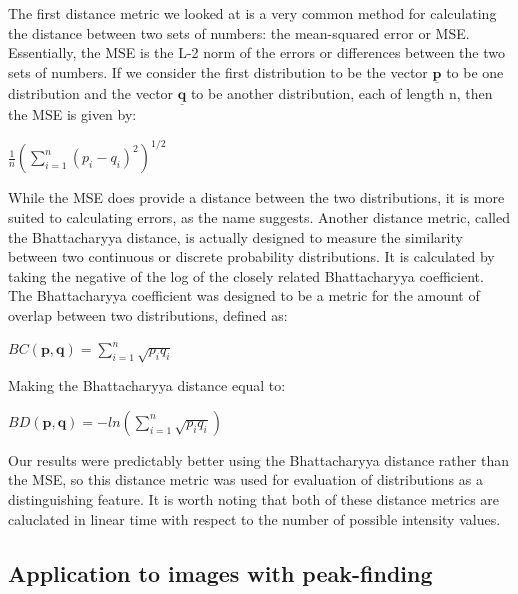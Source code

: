The first distance metric we looked at is a very common method for calculating the distance between two sets of numbers: the mean-squared error or MSE.
Essentially, the MSE is the L-2 norm of the errors or differences between the two sets of numbers.
If we consider the first distribution to be the vector $\underline{\mathbf{p}}$ to be one distribution and the vector $\underline{\mathbf{q}}$ to be another distribution, each of length n, then the MSE is given by:

\begin{center}
\begin{math}
\frac{1}{n} (\sum\limits_{i=1}^n{(p_i-q_i)^2})^{1/2}
\end{math}
\end{center}

While the MSE does provide a distance between the two distributions, it is more suited to calculating errors, as the name suggests.
Another distance metric, called the Bhattacharyya distance, is actually designed to measure the similarity between two continuous or discrete probability distributions.
It is calculated by taking the negative of the log of the closely related Bhattacharyya coefficient.
The Bhattacharyya coefficient was designed to be a metric for the amount of overlap between two distributions, defined as:

\begin{center}
\begin{math}
BC(\mathbf{p}, \mathbf{q}) = \sum\limits_{i=1}^n{\sqrt{p_iq_i}}
\end{math}
\end{center}

\noindent Making the Bhattacharyya distance equal to:

\begin{center}
\begin{math}
BD(\mathbf{p}, \mathbf{q}) = -ln(\sum\limits_{i=1}^n{\sqrt{p_iq_i}})
\end{math}
\end{center}

Our results were predictably better using the Bhattacharyya distance rather than the MSE, so this distance metric was used for evaluation of distributions as a distinguishing feature. It is worth noting that both of these distance metrics are caluclated in linear time with respect to the number of possible intensity values.

\subsection{Application to images with peak-finding}

